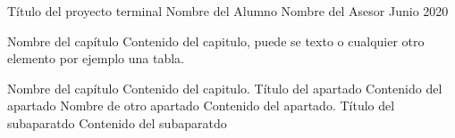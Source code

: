 \documentclass{./class/pt}
\begin{document}
    \portadaTSI
        {Título del proyecto terminal}
        {Nombre del Alumno}
        {Nombre del Asesor}
        {Junio 2020}


    \capituloPt
        {Nombre del capítulo}
        {
            Contenido del capitulo, puede se texto o cualquier otro elemento
            por ejemplo una tabla.
        }

    \capituloPt
        {Nombre del capítulo}
        {
            Contenido del capitulo.
            \apartado
                {Título del apartado}
                {Contenido del apartado}
            \apartado
                {Nombre de otro apartado}
                {
                    Contenido del apartado.
                    \subapartado
                        {Título del subaparatdo}
                        {Contenido del subaparatdo}
                }
        }
\end{document}
